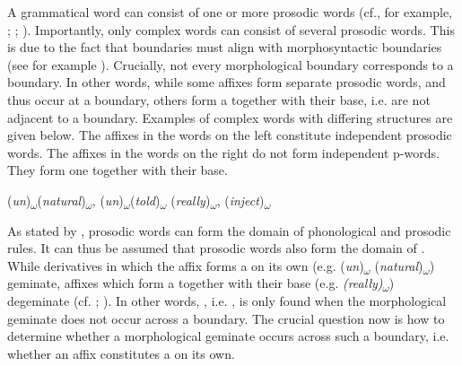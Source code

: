  A grammatical word can consist of one or more prosodic words (cf., for example, \citealt[29]{Booij.1983b}; \citealt[267]{Booij.1985}; \citealt[2]{Hall.2001}). Importantly, only complex words can consist of several prosodic words. This is due to the fact that  boundaries must align with morphosyntactic boundaries (see for example \citealt[2]{Hall.2001}). Crucially, not every morphological boundary corresponds to a  boundary. In other words, while some affixes form separate prosodic words, and thus occur at a  boundary, others form a  together with their base, i.e. are not adjacent to a  boundary. 
Examples of complex words with differing  structures are given below. The affixes in the words on the left constitute independent prosodic words. The affixes in the words on the right do not form independent p-words. They form one  together with their base. 

\begin{multicols}{2}

\begin{exe}
		\centering	
	\ex (\textit{un})\textsubscript{$\omega$}(\textit{natural})\textsubscript{$\omega$}, (\textit{un})\textsubscript{$\omega$}(\textit{told})\textsubscript{$\omega$}
\columnbreak
	\ex (\textit{really})\textsubscript{$\omega$}, (\textit{inject})\textsubscript{$\omega$}
\end{exe}

\end{multicols}



As stated by \citet[3]{Hall.2001}, prosodic words can form the domain of phonological and prosodic rules. It can thus be assumed that prosodic words also form the domain of . While derivatives in which the affix forms a  on its own (e.g. (\textit{un})\textsubscript{$\omega$} (\textit{natural})\textsubscript{$\omega$}) geminate, affixes which form a  together with their base (e.g. \textit{(really)}\textsubscript{$\omega$}) degeminate (cf. \citealt[3543]{Giegerich.2012}; \citealt{Bergmann.}). In other words, , i.e. , is only found when the morphological geminate does not occur across a  boundary. The crucial question now is how to determine whether a morphological geminate occurs across such a boundary, i.e. whether an affix constitutes a  on its own.



